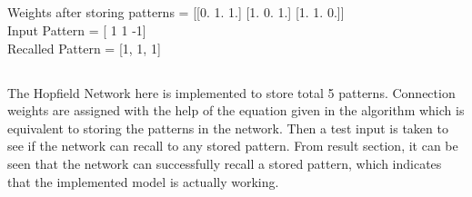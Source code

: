 \documentclass{article}
\begin{document}
    \subsection{}
    \large{
   Weights after storing patterns = [[0. 1. 1.]
 [1. 0. 1.]
 [1. 1. 0.]]\\
Input Pattern = [ 1  1 -1]\\
Recalled Pattern = [1, 1, 1]
}
    \vspace{0.5cm}


    \subsection{}

    \noindent The Hopfield Network here is implemented to store total 5 patterns. Connection weights are assigned with the help of the equation given in the algorithm which is equivalent to storing the patterns in the network. Then a test input is taken to see if the network can recall to any stored pattern. From result section, it can be seen that the network can successfully recall a stored pattern, which indicates that the implemented model is actually working.




\end{document}
